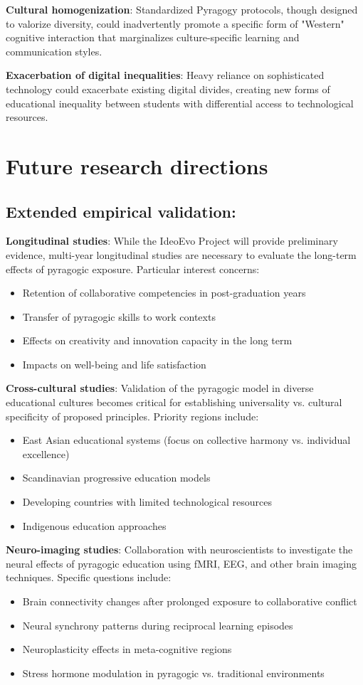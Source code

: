 \textbf{Cultural homogenization}:
Standardized Pyragogy protocols, though designed to valorize diversity, could inadvertently promote a specific form of "Western" cognitive interaction that marginalizes culture-specific learning and communication styles.

\textbf{Exacerbation of digital inequalities}:
Heavy reliance on sophisticated technology could exacerbate existing digital divides, creating new forms of educational inequality between students with differential access to technological resources.

\section{Future research directions}
\subsection*{Extended empirical validation:}

\textbf{Longitudinal studies}:
While the IdeoEvo Project will provide preliminary evidence, multi-year longitudinal studies are necessary to evaluate the long-term effects of pyragogic exposure. Particular interest concerns:
\begin{itemize}
	\item Retention of collaborative competencies in post-graduation years
	\item Transfer of pyragogic skills to work contexts
	\item Effects on creativity and innovation capacity in the long term
	\item Impacts on well-being and life satisfaction
\end{itemize}

\textbf{Cross-cultural studies}:
Validation of the pyragogic model in diverse educational cultures becomes critical for establishing universality vs. cultural specificity of proposed principles. Priority regions include:
\begin{itemize}
	\item East Asian educational systems (focus on collective harmony vs. individual excellence)
	\item Scandinavian progressive education models
	\item Developing countries with limited technological resources
	\item Indigenous education approaches
\end{itemize}

\textbf{Neuro-imaging studies}:
Collaboration with neuroscientists to investigate the neural effects of pyragogic education using fMRI, EEG, and other brain imaging techniques. Specific questions include:
\begin{itemize}
	\item Brain connectivity changes after prolonged exposure to collaborative conflict
	\item Neural synchrony patterns during reciprocal learning episodes
	\item Neuroplasticity effects in meta-cognitive regions
	\item Stress hormone modulation in pyragogic vs. traditional environments
\end{itemize}

